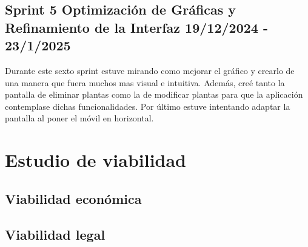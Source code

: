 \subsection{Sprint 5 Optimización de Gráficas y Refinamiento de la Interfaz  19/12/2024 - 23/1/2025}
Durante este sexto sprint estuve mirando como mejorar el gráfico y crearlo de una manera que fuera muchos mas visual e intuitiva. Además, creé tanto la pantalla de eliminar plantas como la de modificar plantas para que la aplicación contemplase dichas funcionalidades.
Por último estuve intentando adaptar la pantalla al poner el móvil en horizontal.


\section{Estudio de viabilidad}

\subsection{Viabilidad económica}

\subsection{Viabilidad legal}

